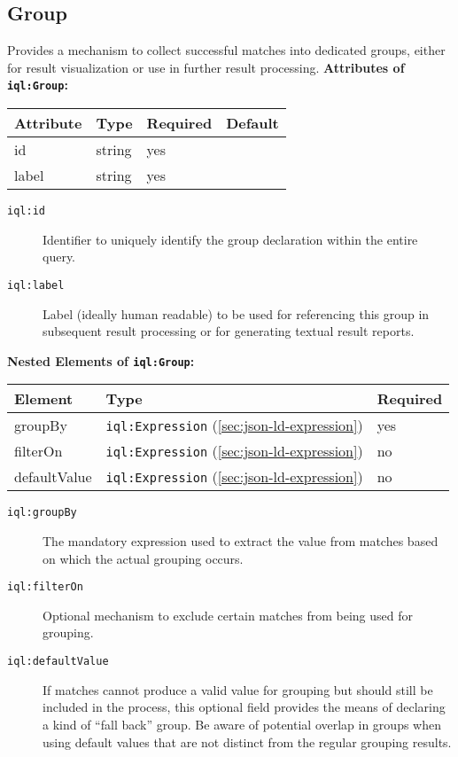 \documentclass[11pt,a4paper,portrait]{article}
\newcommand{\iqlns}{iql:}
\newcommand{\iqlType}[1]{\texttt{\iqlns#1}}
\newcommand{\desc}[1]{\noindent#1\newline\medskip}
\newenvironment{attributes}[1]{
\noindent\textbf{Attributes of #1:}\newline\medskip
\begin{tabular}{|p{0.3\textwidth}|p{0.20\textwidth}|p{0.20\textwidth}|p{0.17\textwidth}|}
	\hline
	\textbf{Attribute} & \textbf{Type} & \textbf{Required} & \textbf{Default} \\ 
	\hline
	\hline
}{
\end{tabular}
}
\newcommand{\attribute}[4]{
	#1 & #2 & #3 & #4 \\
	\hline
}
\newenvironment{elements}[1]{
\noindent\textbf{Nested Elements of #1:}\newline\medskip
\begin{tabular}{|p{0.3\textwidth}|p{0.42\textwidth}|p{0.17\textwidth}|}
	\hline
	\textbf{Element} & \textbf{Type} & \textbf{Required} \\ 
	\hline
	\hline
}{
\end{tabular}
}
\newcommand{\element}[3]{
#1 & #2 & #3 \\
\hline
}
\begin{document}
\subsection{Group}
\label{sec:json-ld-group}
\desc{Provides a mechanism to collect successful matches into dedicated groups, either for result visualization or use in further result processing.}
\begin{attributes}{\iqlType{Group}}
	\attribute{id}{string}{yes}{}
	\attribute{label}{string}{yes}{}
\end{attributes}
\begin{description}
	\item[\iqlType{id}] Identifier to uniquely identify the group declaration within the entire query.
	\item[\iqlType{label}] Label (ideally human readable) to be used for referencing this group in subsequent result processing or for generating textual result reports.
\end{description}
\begin{elements}{\iqlType{Group}}
	\element{groupBy}{\iqlType{Expression} (\ref{sec:json-ld-expression})}{yes}
	\element{filterOn}{\iqlType{Expression} (\ref{sec:json-ld-expression})}{no}
	\element{defaultValue}{\iqlType{Expression} (\ref{sec:json-ld-expression})}{no}
\end{elements}
\begin{description}
	\item[\iqlType{groupBy}] The mandatory expression used to extract the value from matches based on which the actual grouping occurs.
	\item[\iqlType{filterOn}] Optional mechanism to exclude certain matches from being used for grouping.
	\item[\iqlType{defaultValue}] If matches cannot produce a valid value for grouping but should still be included in the process, this optional field provides the means of declaring a kind of ``fall back'' group. Be aware of potential overlap in groups when using default values that are not distinct from the regular grouping results.
\end{description}
\end{document}
